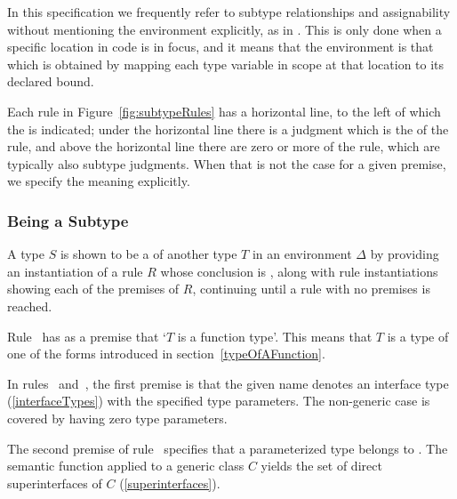 \documentclass[makeidx]{article}
\begin{document}
\LMHash{}%
In this specification we frequently refer to
subtype relationships and assignability
without mentioning the environment explicitly,
as in .
This is only done when a specific location in code is in focus,
and it means that the environment is that which is obtained
by mapping each type variable in scope at that location
to its declared bound.

\LMHash{}%
Each rule in Figure~\ref{fig:subtypeRules} has a horizontal line,
to the left of which the  is indicated;
under the horizontal line there is a judgment which is the
of the rule,
and above the horizontal line there are zero or more
of the rule,
which are typically also subtype judgments.
When that is not the case for a given premise,
we specify the meaning explicitly.



\subsubsection{Being a Subtype}

\LMHash{}%
A type $S$ is shown to be a  of another type $T$
in an environment $\Delta$ by providing
an instantiation of a rule $R$ whose conclusion is
,
along with rule instantiations showing
each of the premises of $R$,
continuing until a rule with no premises is reached.

\LMHash{}%
Rule~\SrnRightFunction{} has as a premise that `$T$ is a function type'.
This means that $T$ is a type of one of the forms introduced in
section~\ref{typeOfAFunction}.

\LMHash{}%
In rules~\SrnCovariance{} and~\SrnNominal,
the first premise is that the given name denotes an interface type
(\ref{interfaceTypes})
with the specified type parameters.
The non-generic case is covered by having zero type parameters.

\LMHash{}%
The second premise of rule~\SrnNominal{} specifies that
a parameterized type  belongs to
.
The semantic function \Superinterfaces{\_} applied to a generic class $C$ yields
the set of direct superinterfaces of $C$
(\ref{superinterfaces}).
\end{document}
